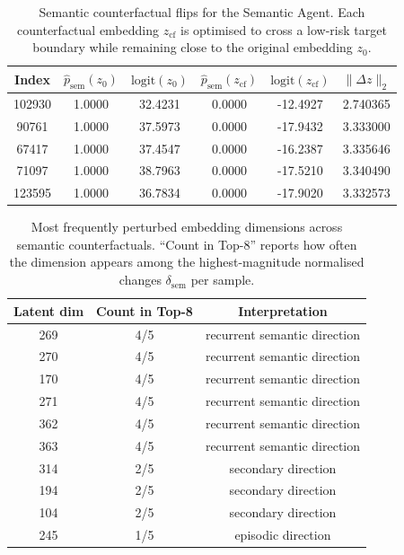 \documentclass[3p]{elsarticle}
\begin{document}
\begin{table}[t]
\centering
\begin{tabular}{c c c c c c}
\hline
\textbf{Index} & $\hat{p}_{\mathrm{sem}}(z_0)$ & $\mathrm{logit}(z_0)$ &
$\hat{p}_{\mathrm{sem}}(z_{\mathrm{cf}})$ & $\mathrm{logit}(z_{\mathrm{cf}})$ &
$\lVert \Delta z\rVert_2$ \\
\hline
102930 & 1.0000 & 32.4231 & 0.0000 & -12.4927 & 2.740365 \\
90761  & 1.0000 & 37.5973 & 0.0000 & -17.9432 & 3.333000 \\
67417  & 1.0000 & 37.4547 & 0.0000 & -16.2387 & 3.335646 \\
71097  & 1.0000 & 38.7963 & 0.0000 & -17.5210 & 3.340490 \\
123595 & 1.0000 & 36.7834 & 0.0000 & -17.9020 & 3.332573 \\
\hline
\end{tabular}
\caption{Semantic counterfactual flips for the Semantic Agent. Each counterfactual embedding $z_{\mathrm{cf}}$ is optimised to cross a low-risk target boundary while remaining close to the original embedding $z_0$.}
\label{tab:sem_cf_flips}
\end{table}


\begin{table}[t]
\centering
\begin{tabular}{c c c}
\hline
\textbf{Latent dim} & \textbf{Count in Top-8} & \textbf{Interpretation} \\
\hline
269 & 4/5 & recurrent semantic direction \\
270 & 4/5 & recurrent semantic direction \\
170 & 4/5 & recurrent semantic direction \\
271 & 4/5 & recurrent semantic direction \\
362 & 4/5 & recurrent semantic direction \\
363 & 4/5 & recurrent semantic direction \\
314 & 2/5 & secondary direction \\
194 & 2/5 & secondary direction \\
104 & 2/5 & secondary direction \\
245 & 1/5 & episodic direction \\
\hline
\end{tabular}
\caption{Most frequently perturbed embedding dimensions across semantic counterfactuals. ``Count in Top-8'' reports how often the dimension appears among the highest-magnitude normalised changes $\delta_{\mathrm{sem}}$ per sample.}
\label{tab:sem_cf_dims}
\end{table}
\end{document}
